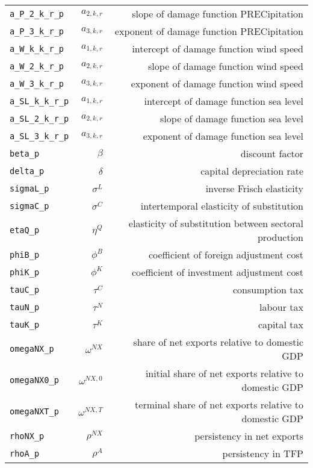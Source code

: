 \begin{center}
\begin{longtable}{lrr}
\texttt{a\_P\_2\_k\_r\_p} & ${a_{2,k,r}}$ & slope of damage function PRECipitation\\
\texttt{a\_P\_3\_k\_r\_p} & ${a_{3,k,r}}$ & exponent of damage function PRECipitation\\
\texttt{a\_W\_k\_k\_r\_p} & ${a_{1,k,r}}$ & intercept of damage function wind speed\\
\texttt{a\_W\_2\_k\_r\_p} & ${a_{2,k,r}}$ & slope of damage function wind speed\\
\texttt{a\_W\_3\_k\_r\_p} & ${a_{3,k,r}}$ & exponent of damage function wind speed\\
\texttt{a\_SL\_k\_k\_r\_p} & ${a_{1,k,r}}$ & intercept of damage function sea level\\
\texttt{a\_SL\_2\_k\_r\_p} & ${a_{2,k,r}}$ & slope of damage function sea level\\
\texttt{a\_SL\_3\_k\_r\_p} & ${a_{3,k,r}}$ & exponent of damage function sea level\\
\texttt{beta\_p} & ${\beta}$ & discount factor\\
\texttt{delta\_p} & ${\delta}$ & capital depreciation rate\\
\texttt{sigmaL\_p} & ${\sigma^{L}}$ & inverse Frisch elasticity\\
\texttt{sigmaC\_p} & ${\sigma^{C}}$ & intertemporal elasticity of substitution\\
\texttt{etaQ\_p} & ${\eta^{Q}}$ & elasticity of substitution between sectoral production\\
\texttt{phiB\_p} & ${\phi^{B}}$ & coefficient of foreign adjustment cost\\
\texttt{phiK\_p} & ${\phi^{K}}$ & coefficient of investment adjustment cost\\
\texttt{tauC\_p} & ${\tau^{C}}$ & consumption tax\\
\texttt{tauN\_p} & ${\tau^{N}}$ & labour tax\\
\texttt{tauK\_p} & ${\tau^{K}}$ & capital tax\\
\texttt{omegaNX\_p} & ${\omega^{NX}}$ & share of net exports relative to domestic GDP\\
\texttt{omegaNX0\_p} & ${\omega^{NX,0}}$ & initial share of net exports relative to domestic GDP\\
\texttt{omegaNXT\_p} & ${\omega^{NX,T}}$ & terminal share of net exports relative to domestic GDP\\
\texttt{rhoNX\_p} & ${\rho^{NX}}$ & persistency in net exports\\
\texttt{rhoA\_p} & ${\rho^{A}}$ & persistency in TFP\\

\end{longtable}
\end{center}
